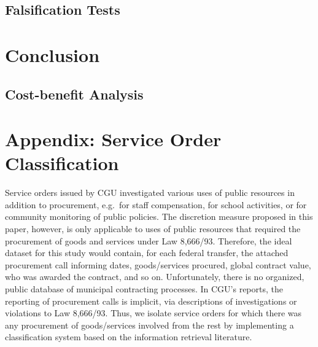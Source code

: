 \documentclass[11pt]{article}
\begin{document}
\newpage

\subsection{Falsification Tests} \label{subsec:discussion}

\section{Conclusion} \label{sec:conclusion}

\subsection{Cost-benefit Analysis} \label{subsec:cba}


\setlength\bibsep{0pt}



\clearpage







\clearpage

\appendix

\section{Appendix: Service Order Classification} \label{sec:appendixA}

Service orders issued by CGU investigated various uses of public resources in addition to procurement, e.g.~for staff compensation, for school activities, or for community monitoring of public policies. The discretion measure proposed in this paper, however, is only applicable to uses of public resources that required the procurement of goods and services under Law 8,666/93. Therefore, the ideal dataset for this study would contain, for each federal transfer, the attached procurement call informing dates, goods/services procured, global contract value, who was awarded the contract, and so on. Unfortunately, there is no organized, public database of municipal contracting processes. In CGU's reports, the reporting of procurement calls is implicit, via descriptions of investigations or violations to Law 8,666/93. Thus, we isolate service orders for which there was any procurement of goods/services involved from the rest by implementing a classification system based on the information retrieval literature.
\end{document}

